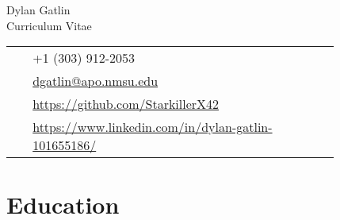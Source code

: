 \documentclass[11pt]{article} %
\begin{document}
\begin{paracol}{2} %


\parbox[top][0.12\textheight][c]{\linewidth}{
    \vspace{-0.04\textheight}
    \centering
    {\sffamily\Huge Dylan Gatlin}\\\medskip %
    {\Huge\color{headings}\cvtextfont Curriculum Vitae}
}
\switchcolumn

\parbox[top][0.12\textheight][c]{\linewidth}{
    \vspace{-0.04\textheight}
    \colorbox{shade}{
        \begin{supertabular}{p{0.05\linewidth}|p{0.775\linewidth}}
            \raisebox{-1pt}{\faPhone} & +1 (303) 912-2053 \\
            \raisebox{0pt}{\small\faEnvelope} &
             \href{mailto:dgatlin@apo.nmsu.edu}
             {dgatlin@apo.nmsu.edu} \\
            \raisebox{-1pt}{\faGithub} &
             \href{https://github.com/StarkillerX42}
             {https://github.com/StarkillerX42} \\
            \raisebox{-1pt}{\faLinkedinSquare} &
             \href{https://www.linkedin.com/in/dylan-gatlin-101655186/}
             {https://www.linkedin.com/in/dylan-gatlin-101655186/} \\
        \end{supertabular}
    }
}
\end{paracol}


\pagebreak[3]
\section{Education} 






\end{document}
